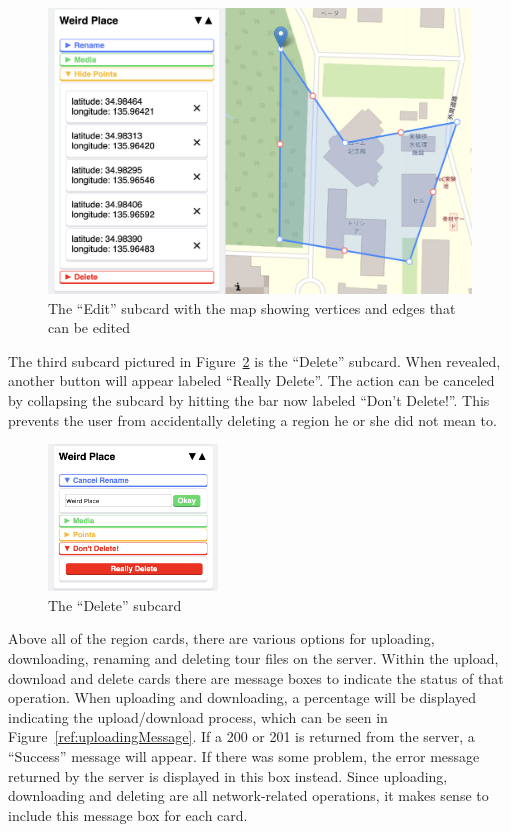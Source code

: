 \documentclass[a4paper, 10pt, american, titlepage]{article}
\begin{document}
\begin{figure}[h]
	\centering
    \includegraphics[width=\textwidth]{edit-subcard-with-map-editour.png}
    \caption{The ``Edit'' subcard with the map showing vertices and edges that
    can be edited}
	\label{fig:editSubcardWithMap}
\end{figure}

The third subcard pictured in Figure~\ref{fig:deleteSubcard} is the ``Delete''
subcard. When revealed, another button will appear labeled ``Really Delete''.
The action can be canceled by collapsing the subcard by hitting the bar now
labeled ``Don't Delete!''. This prevents the user from accidentally deleting a
region he or she did not mean to.

\begin{figure}[h]
	\centering
    \includegraphics[width=0.4\textwidth]{delete-subcard-editour.png}
    \caption{The ``Delete'' subcard}
	\label{fig:deleteSubcard}
\end{figure}

Above all of the region cards, there are various options for uploading,
downloading, renaming and deleting tour files on the server. Within the upload,
download and delete cards there are message boxes to indicate the status of
that operation. When uploading and downloading, a percentage will be displayed
indicating the upload/download process, which can be seen in
Figure~\ref{ref:uploadingMessage}. If a 200 or 201 is returned from the server,
a ``Success'' message will appear. If there was some problem, the error message
returned by the server is displayed in this box instead. Since uploading,
downloading and deleting are all network-related operations, it makes sense to
include this message box for each card.
\end{document}
